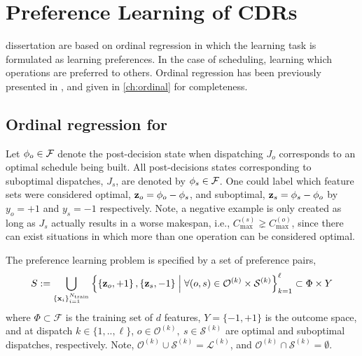 
\chapter{Preference Learning of CDRs}\label{ch:prefmodels} 
 dissertation are based on ordinal regression in which the learning task is formulated as learning preferences. In the case of scheduling, learning which operations are preferred to others. Ordinal regression has been previously presented in \cite{Ru06:PPSN}, and given in \cref{ch:ordinal} for completeness. 

\section{Ordinal regression for \jsp}
Let ${\mathbf{\phi}}_{o}\in\mathcal{F}$ denote the post-decision state when dispatching $J_o$ corresponds to an optimal schedule being built. All post-decisions states corresponding to suboptimal dispatches, $J_s$, are denoted by ${\mathbf{\phi}}_{s}\in\mathcal{F}$. One could label which feature sets were considered optimal, $\mathbf{z}_{o}={\mathbf{\phi}}_{o}-{\mathbf{\phi}}_{s}$, and suboptimal, $\mathbf{z}_{s}={\mathbf{\phi}}_{s}-{\mathbf{\phi}}_{o}$ by $y_o=+1$ and $y_s=-1$ respectively. 
Note, a negative example is only created as long as $J_s$ actually results in a worse makespan, i.e., $C_{\max}^{(s)}\gneq C_{\max}^{(o)}$, since there can exist situations in which more than one operation can be considered optimal.

The preference learning problem is specified by a set of preference pairs,
\begin{equation}\label{eq:S:jsp}
	S := \bigcup_{\{\vec{x}_i\}_{i=1}^{N_{\text{train}}}}
    \condset{
        \left\{\vec{z}_o,+1\right\},\left\{\vec{z}_s,-1\right\}}{\forall (o,s) 
        \in \mathcal{O}^{(k)} \times \mathcal{S}^{(k)}}_{k=1}^{\ell} 
    \subset \Phi\times Y 
\end{equation}
where $\Phi\subset\mathcal{F}$ is the training set of $d$ features, 
$Y=\{-1,+1\}$ is the outcome space, and at dispatch $k\in\{1,..,\ell\}$, 
$o\in\mathcal{O}^{(k)},~s\in \mathcal{S}^{(k)}$
are optimal and suboptimal dispatches, respectively.
Note, $\mathcal{O}^{(k)}\cup\mathcal{S}^{(k)}=\mathcal{L}^{(k)}$, and 
$\mathcal{O}^{(k)}\cap\mathcal{S}^{(k)}=\emptyset$. 

